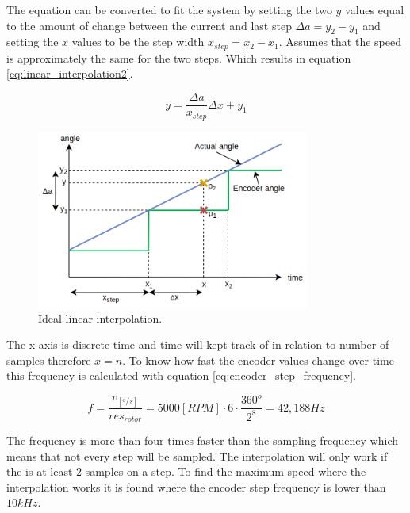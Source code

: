 The equation can be converted to fit the system by setting the two $y$ values equal to the amount of change between the current and last step $\Delta a = y_2 - y_1$ and setting the $x$ values to be the step width $x_{step} = x_2 - x_1$. Assumes that the speed is approximately the same for the two steps. Which results in equation \ref{eq:linear_interpolation2}.



\begin{equation}
    y =  \frac{\Delta a}{x_{step}} \Delta x+y_1
    \label{eq:linear_interpolation2}
\end{equation}

\begin{figure}[H]
	\centering
	\includegraphics[width=0.8\textwidth]{pictures/software/angle_interpolation1.png}
	\caption{Ideal linear interpolation.}
	\label{fig:angle_interpolation1}
\end{figure}

The x-axis is discrete time and time will kept track of in relation to number of samples therefore $x = n$. To know how fast the encoder values change over time this frequency is calculated with equation \ref{eq:encoder_step_frequency}.

\begin{equation}
    f = \frac{v_{[^o/s]}}{res_{rotor}} = 5000 [RPM] \cdot 6 \cdot \frac{360^o}{2^8} = 42,188Hz
    \label{eq:encoder_step_frequency}
\end{equation}

The frequency is more than four times faster than the sampling frequency which means that not every step will be sampled. The interpolation will only work if the is at least 2 samples on a step. To find the maximum speed where the interpolation works it is found where the encoder step frequency is lower than $10kHz$.

